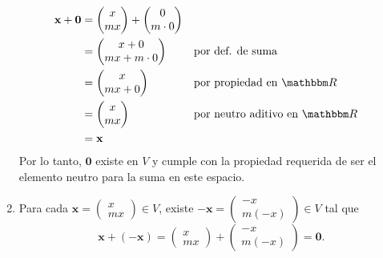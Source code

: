\begin{examplebox}{}{}
\begin{enumerate}[label=\roman*), topsep=6pt, itemsep=0pt]
        \begin{align*}
            \mathbf{x} + \mathbf{0} & = \begin{pmatrix}
                x \\
                mx
            \end{pmatrix} + \begin{pmatrix}
                0 \\
                m \cdot 0
            \end{pmatrix} \\
            & = \begin{pmatrix}
                x + 0 \\
                mx + m \cdot 0
            \end{pmatrix} && \text{por def. de suma} \\
            & = \begin{pmatrix}
                x \\
                mx + 0
            \end{pmatrix} && \text{por propiedad en $\RR$} \\
            & = \begin{pmatrix}
                x \\
                mx
            \end{pmatrix} && \text{por neutro aditivo en $\RR$} \\
            & = \mathbf{x}
        \end{align*}
        Por lo tanto, $\mathbf{0}$ existe en $V$ y cumple con la propiedad requerida de ser el elemento neutro para la suma en este espacio.
        \item Para cada $\mathbf{x} = \begin{pmatrix}
            x \\
            mx
        \end{pmatrix} \in V$, existe $-\mathbf{x} = \begin{pmatrix}
            -x \\
            m(-x)
        \end{pmatrix} \in V$ tal que
        $$\mathbf{x} + (-\mathbf{x}) = \begin{pmatrix}
            x \\
            mx
        \end{pmatrix} + \begin{pmatrix}
            -x \\
            m(-x)
        \end{pmatrix} = \mathbf{0}.$$

\end{enumerate}
\end{examplebox}
